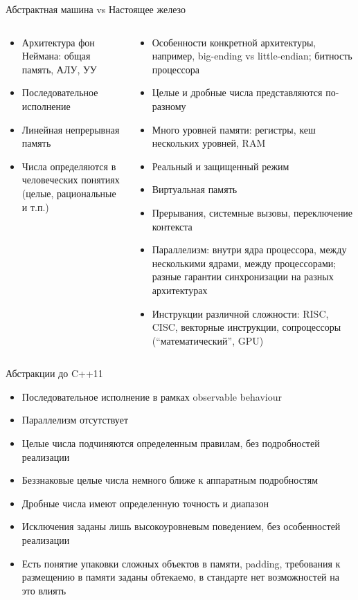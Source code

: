 \documentclass[unknownkeysallowed,xcolor=table]{beamer}
\begin{document}
\begin{frame}[t]{Абстрактная машина vs Настоящее железо}
  \scriptsize
  \begin{columns}[t]
    \begin{column}{0.5\textwidth}
      \begin{itemize}
        \item Архитектура фон Неймана: общая память, АЛУ, УУ
        \item Последовательное исполнение
        \item Линейная непрерывная память
        \item Числа определяются в человеческих понятиях (целые, рациональные и т.п.)
      \end{itemize}
    \end{column}
    \begin{column}{0.5\textwidth}
      \begin{itemize}
        \item Особенности конкретной архитектуры, например, big-ending vs little-endian; битность процессора
        \item Целые и дробные числа представляются по-разному
        \item Много уровней памяти: регистры, кеш нескольких уровней, RAM
        \item Реальный и защищенный режим
        \item Виртуальная память
        \item Прерывания, системные вызовы, переключение контекста
        \item Параллелизм: внутри ядра процессора, между несколькими ядрами, между процессорами; разные гарантии синхронизации на разных архитектурах
        \item Инструкции различной сложности: RISC, CISC, векторные инструкции, сопроцессоры (“математический”, GPU)
      \end{itemize}
    \end{column}
  \end{columns}
  \normalsize
\end{frame}

\begin{frame}{Абстракции до C++11}
  \begin{itemize}
    \item Последовательное исполнение в рамках observable behaviour
    \item Параллелизм отсутствует
    \item Целые числа подчиняются определенным правилам, без подробностей реализации
    \item Беззнаковые целые числа немного ближе к аппаратным подробностям
    \item Дробные числа имеют определенную точность и диапазон
    \item Исключения заданы лишь высокоуровневым поведением, без особенностей реализации
    \item Есть понятие упаковки сложных объектов в памяти, padding, требования к размещению в памяти заданы обтекаемо, в стандарте нет возможностей на это влиять
  \end{itemize}
\end{frame}
\end{document}
